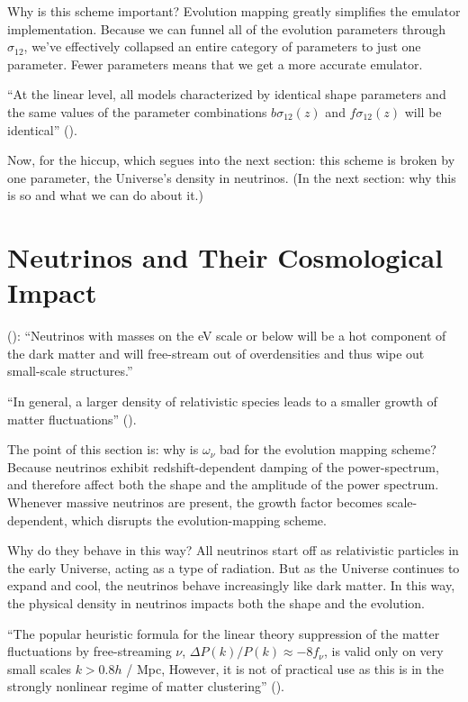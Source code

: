 Why is this scheme important? Evolution mapping greatly simplifies the emulator
implementation. Because we can
funnel all of the evolution parameters through $\sigma_{12}$, we've effectively
collapsed an entire category of parameters to just one parameter. Fewer
parameters means that we get a more accurate emulator.

``At the linear level, all models characterized by identical shape parameters
and the same values of the parameter combinations $b \sigma_{12}(z)$ and
$f \sigma_{12}(z)$ will be identical'' ().

Now, for the hiccup, which segues into the next section: this scheme is broken by one parameter, the Universe's
density in neutrinos. (In the next section: why this is so and what we can do
about it.)


\section{Neutrinos and Their Cosmological Impact}

(): ``Neutrinos with masses on the eV scale or below will be a
hot component of the dark matter and will free-stream out of overdensities and
thus wipe out small-scale structures.''

``In general, a larger density of relativistic species leads to a smaller
growth of matter fluctuations'' ().

The point of this section is: why is $\omega_\nu$ bad for the
evolution mapping scheme? Because neutrinos exhibit redshift-dependent
damping of the power-spectrum, and therefore affect both the shape and the
amplitude of the power spectrum. Whenever massive neutrinos are present,
the growth factor becomes scale-dependent, which disrupts the
evolution-mapping scheme.

Why do they behave in this way? All neutrinos start off as
relativistic particles in the early Universe, acting as a type of radiation.
But as the Universe continues to expand and cool, the neutrinos behave
increasingly like dark matter.
In this way, the physical density in neutrinos impacts both the shape and the
evolution.

``The popular heuristic formula for the linear theory suppression of the matter
fluctuations by free-streaming $\nu$, $\Delta P(k) / P(k) \approx -8 f_\nu$, is
valid only on very small scales $k > 0.8 h$ / Mpc, However, it is not of
practical use as this is in the strongly nonlinear regime of matter
clustering'' ().

